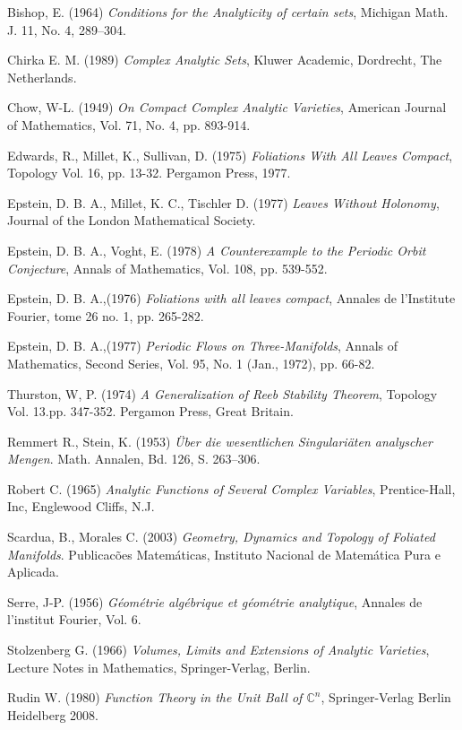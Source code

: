 \documentclass[letterpaper]{report}
\newcommand{\con}{\ensuremath{\mathbb{C}^n}}
\begin{document}
\begin{thebibliography}{3}
 Bishop, E. (1964) \textit{Conditions for the Analyticity  of certain sets}, Michigan Math. J. 11, No. 4, 289--304. 

 Chirka E. M. (1989) \textit{Complex Analytic Sets}, Kluwer
Academic, Dordrecht,  The Netherlands. 

 Chow, W-L. (1949) \textit{On Compact Complex Analytic Varieties},
American Journal of Mathematics, Vol. 71, No. 4, pp. 893-914.

 Edwards, R., Millet, K., Sullivan, D. (1975) \textit{Foliations
With All Leaves Compact}, Topology Vol. 16, pp. 13-32. Pergamon Press, 1977.

 Epstein, D. B. A., Millet, K. C., Tischler D.
(1977) \textit{Leaves Without Holonomy}, Journal of the London Mathematical
Society.

 Epstein, D. B. A., Voght, E. (1978) \textit{A Counterexample to the Periodic Orbit Conjecture}, 
Annals of Mathematics, Vol. 108, pp. 539-552. 

 Epstein, D. B. A.,(1976) \textit{Foliations with all leaves compact}, Annales de l'Institute Fourier, 
tome 26 no. 1, pp. 265-282.

 Epstein, D. B. A.,(1977) \textit{Periodic Flows on Three-Manifolds}, Annals of Mathematics, 
Second Series, Vol. 95, No. 1 (Jan., 1972), pp. 66-82.

 Thurston, W, P. (1974) \textit{A Generalization of Reeb Stability Theorem}, Topology Vol. 13.pp. 347-352.
Pergamon Press, Great Britain.
 
 Remmert R., Stein, K. (1953) \textit{Über die wesentlichen
Singulariäten analyscher Mengen}. Math. Annalen, Bd. 126, S. 263--306.

 Robert C. (1965) \textit{Analytic Functions of Several
Complex Variables}, Prentice-Hall, Inc, Englewood Cliffs, N.J.

 Scardua, B., Morales C. (2003) \textit{Geometry, Dynamics
and Topology of Foliated Manifolds}. Publicac\~oes Matem\'aticas, Instituto
Nacional de Matem\'atica Pura e Aplicada.

 Serre, J-P. (1956) \textit{G\'eom\'etrie alg\'ebrique et
g\'eom\'etrie analytique}, Annales de l'institut Fourier, Vol. 6. 

 Stolzenberg G. (1966) \textit{Volumes, Limits and
Extensions of Analytic Varieties}, Lecture Notes in Mathematics,
Springer-Verlag, Berlin. 

 Rudin W. (1980) \textit{Function Theory in the Unit Ball of
$\con$}, Springer-Verlag Berlin Heidelberg 2008.
\end{thebibliography}
\end{document}
